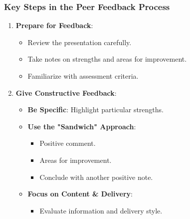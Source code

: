 \documentclass[aspectratio=169]{beamer}
\begin{document}
\begin{frame}[fragile]
    \frametitle{Key Steps in the Peer Feedback Process}
    \begin{enumerate}
        \item \textbf{Prepare for Feedback}:
            \begin{itemize}
                \item Review the presentation carefully.
                \item Take notes on strengths and areas for improvement.
                \item Familiarize with assessment criteria.
            \end{itemize}
        \item \textbf{Give Constructive Feedback}:
            \begin{itemize}
                \item \textbf{Be Specific}: Highlight particular strengths.
                \item \textbf{Use the "Sandwich" Approach}:
                    \begin{itemize}
                        \item Positive comment.
                        \item Areas for improvement.
                        \item Conclude with another positive note.
                    \end{itemize}
                \item \textbf{Focus on Content \& Delivery}:
                    \begin{itemize}
                        \item Evaluate information and delivery style.
                    \end{itemize}
            \end{itemize}
    \end{enumerate}
\end{frame}
\end{document}
